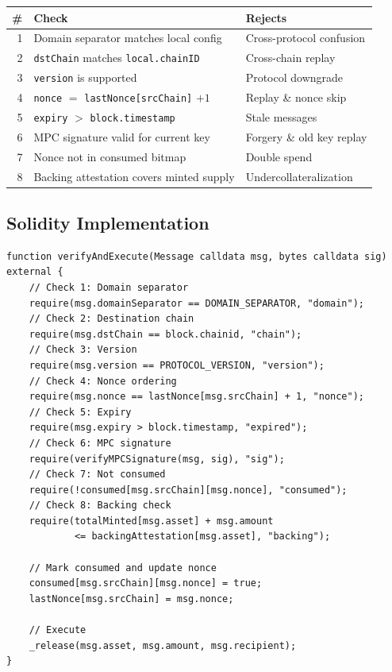 \documentclass[11pt,a4paper]{article}
\begin{document}
\begin{center}
\begin{tabular}{rll}
\toprule
\textbf{\#} & \textbf{Check} & \textbf{Rejects} \\
\midrule
1 & Domain separator matches local config & Cross-protocol confusion \\
2 & \texttt{dstChain} matches \texttt{local.chainID} & Cross-chain replay \\
3 & \texttt{version} is supported & Protocol downgrade \\
4 & \texttt{nonce} $=$ \texttt{lastNonce[srcChain]} $+ 1$ & Replay \& nonce skip \\
5 & \texttt{expiry} $>$ \texttt{block.timestamp} & Stale messages \\
6 & MPC signature valid for current key & Forgery \& old key replay \\
7 & Nonce not in consumed bitmap & Double spend \\
8 & Backing attestation covers minted supply & Undercollateralization \\
\bottomrule
\end{tabular}
\end{center}

\subsection{Solidity Implementation}

\begin{lstlisting}[language=Solidity,caption={Verification function (simplified)}]
function verifyAndExecute(Message calldata msg, bytes calldata sig) external {
    // Check 1: Domain separator
    require(msg.domainSeparator == DOMAIN_SEPARATOR, "domain");
    // Check 2: Destination chain
    require(msg.dstChain == block.chainid, "chain");
    // Check 3: Version
    require(msg.version == PROTOCOL_VERSION, "version");
    // Check 4: Nonce ordering
    require(msg.nonce == lastNonce[msg.srcChain] + 1, "nonce");
    // Check 5: Expiry
    require(msg.expiry > block.timestamp, "expired");
    // Check 6: MPC signature
    require(verifyMPCSignature(msg, sig), "sig");
    // Check 7: Not consumed
    require(!consumed[msg.srcChain][msg.nonce], "consumed");
    // Check 8: Backing check
    require(totalMinted[msg.asset] + msg.amount
            <= backingAttestation[msg.asset], "backing");

    // Mark consumed and update nonce
    consumed[msg.srcChain][msg.nonce] = true;
    lastNonce[msg.srcChain] = msg.nonce;

    // Execute
    _release(msg.asset, msg.amount, msg.recipient);
}
\end{lstlisting}
\end{document}
